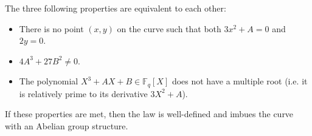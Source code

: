 \documentclass{llncs}
\newcommand{\bF}{\mathbb{F}}
\begin{document}
The three following properties are equivalent to each other:
\begin{itemize}

    \item There is no point $(x, y)$ on the curve such that both
    $3x^2 + A = 0$ and $2y = 0$.

    \item $4A^3 + 27B^2 \neq 0$.

    \item The polynomial $X^3 + AX + B \in \bF_q[X]$ does not have a
    multiple root (i.e. it is relatively prime to its derivative
    $3X^2 + A$).

\end{itemize}
If these properties are met, then the law is well-defined and imbues the
curve with an Abelian group structure.
\end{document}
